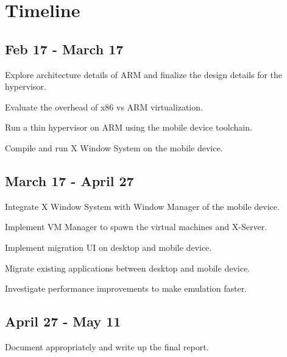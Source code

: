 \section{Timeline}
\subsection{Feb 17 - March 17}
	\begin{itemize*}
	\item Explore architecture details of ARM and finalize the design details for the hypervisor.
	\item Evaluate the overhead of x86 vs ARM virtualization.
	\item Run a thin hypervisor on ARM using the mobile device toolchain.
	\item Compile and run X Window System on the mobile device.
	\end{itemize*}
\subsection{March 17 - April 27}
	\begin{itemize*}
	\item Integrate X Window System with Window Manager of the mobile device.
	\item Implement VM Manager to spawn the virtual machines and X-Server.
  \item Implement migration UI on desktop and mobile device.
  \item Migrate existing applications between desktop and mobile device.
	\item Investigate performance improvements to make emulation faster.
	\end{itemize*}
\subsection{April 27 - May 11}
	\begin{itemize*}
	\item Document appropriately and write up the final report.
	\end{itemize*}
